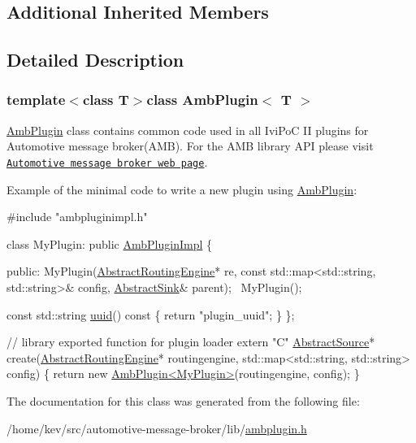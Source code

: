 \subsection*{Additional Inherited Members}


\subsection{Detailed Description}
\subsubsection*{template$<$class T$>$class Amb\+Plugin$<$ T $>$}

\hyperlink{classAmbPlugin}{Amb\+Plugin} class contains common code used in all Ivi\+Po\+C I\+I plugins for Automotive message broker(\+A\+M\+B). For the A\+M\+B library A\+P\+I please visit \href{https://github.com/otcshare/automotive-message-broker}{\tt Automotive message broker web page}.

Example of the minimal code to write a new plugin using \hyperlink{classAmbPlugin}{Amb\+Plugin}\+:


\begin{DoxyCode}
\textcolor{preprocessor}{#include "ambpluginimpl.h"}

\textcolor{keyword}{class }MyPlugin: \textcolor{keyword}{public} \hyperlink{classAmbPluginImpl}{AmbPluginImpl} \{

\textcolor{keyword}{public}:
    MyPlugin(\hyperlink{classAbstractRoutingEngine}{AbstractRoutingEngine}* re, \textcolor{keyword}{const} std::map<std::string, std::string>& 
      config, \hyperlink{classAbstractSink}{AbstractSink}& parent);
    ~MyPlugin();

    \textcolor{keyword}{const} std::string \hyperlink{classAbstractSink_a965ae1d5218713c7823fbd95fa51b053}{uuid}()\textcolor{keyword}{ const }\{ \textcolor{keywordflow}{return} \textcolor{stringliteral}{"plugin\_uuid"}; \}
\};

\textcolor{comment}{// library exported function for plugin loader}
\textcolor{keyword}{extern} \textcolor{stringliteral}{"C"} \hyperlink{classAbstractSource}{AbstractSource}* create(\hyperlink{classAbstractRoutingEngine}{AbstractRoutingEngine}* routingengine, 
      std::map<std::string, std::string> config)
\{
    \textcolor{keywordflow}{return} \textcolor{keyword}{new} \hyperlink{classAmbPlugin}{AmbPlugin<MyPlugin>}(routingengine, config);
\}
\end{DoxyCode}
 

The documentation for this class was generated from the following file\+:\begin{DoxyCompactItemize}
\item 
/home/kev/src/automotive-\/message-\/broker/lib/\hyperlink{ambplugin_8h}{ambplugin.\+h}\end{DoxyCompactItemize}
